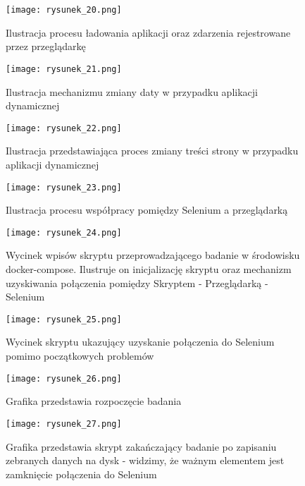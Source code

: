 \begin{figure}[!ht]
    \centering
    \texttt{[image: rysunek\_20.png]}
    \caption{Ilustracja procesu ładowania aplikacji oraz zdarzenia rejestrowane przez przeglądarkę}
    \label{fig:rysunek_20}
\end{figure}

\begin{figure}[!ht]
    \centering
    \texttt{[image: rysunek\_21.png]}
    \caption{Ilustracja mechanizmu zmiany daty w przypadku aplikacji dynamicznej}
    \label{fig:rysunek_21}
\end{figure}

\begin{figure}[!ht]
    \centering
    \texttt{[image: rysunek\_22.png]}
    \caption{Ilustracja przedstawiająca proces zmiany treści strony w przypadku aplikacji dynamicznej}
    \label{fig:rysunek_22}
\end{figure}

\begin{figure}[!ht]
    \centering
    \texttt{[image: rysunek\_23.png]}
    \caption{Ilustracja procesu współpracy pomiędzy Selenium a przeglądarką}
    \label{fig:rysunek_23}
\end{figure}

\begin{figure}[!ht]
    \centering
    \texttt{[image: rysunek\_24.png]}
    \caption{Wycinek wpisów skryptu przeprowadzającego badanie w środowisku docker-compose. Ilustruje on inicjalizację skryptu oraz mechanizm uzyskiwania połączenia pomiędzy Skryptem - Przeglądarką - Selenium}
    \label{fig:rysunek_24}
\end{figure}

\begin{figure}[!ht]
    \centering
    \texttt{[image: rysunek\_25.png]}
    \caption{Wycinek skryptu ukazujący uzyskanie połączenia do Selenium pomimo początkowych problemów}
    \label{fig:rysunek_25}
\end{figure}

\begin{figure}[!ht]
    \centering
    \texttt{[image: rysunek\_26.png]}
    \caption{Grafika przedstawia rozpoczęcie badania}
    \label{fig:rysunek_26}
\end{figure}

\begin{figure}[!ht]
    \centering
    \texttt{[image: rysunek\_27.png]}
    \caption{Grafika przedstawia skrypt zakańczający badanie po zapisaniu zebranych danych na dysk - widzimy, że ważnym elementem jest zamknięcie połączenia do Selenium}
    \label{fig:rysunek_27}
\end{figure}

